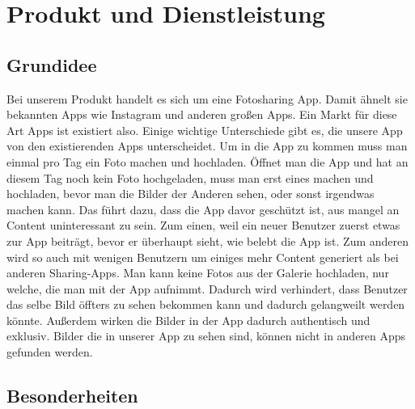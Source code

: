 \chapter{Produkt und Dienstleistung}


\section{Grundidee}

Bei unserem Produkt handelt es sich um eine Fotosharing App. Damit ähnelt sie bekannten Apps wie Instagram und anderen großen Apps. Ein Markt für diese Art Apps ist existiert also. Einige wichtige Unterschiede gibt es, die unsere App von den existierenden Apps unterscheidet.
Um in die App zu kommen muss man einmal pro Tag ein Foto machen und hochladen. Öffnet man die App und hat an diesem Tag noch kein Foto hochgeladen, muss man erst eines machen und hochladen, bevor man die Bilder der Anderen sehen, oder sonst irgendwas machen kann. Das führt dazu, dass die App davor geschützt ist, aus mangel an Content uninteressant zu sein. Zum einen, weil ein neuer Benutzer zuerst etwas zur App beiträgt, bevor er überhaupt sieht, wie belebt die App ist. Zum anderen wird so auch mit wenigen Benutzern um einiges mehr Content generiert als bei anderen Sharing-Apps.
Man kann keine Fotos aus der Galerie hochladen, nur welche, die man mit der App aufnimmt. Dadurch wird verhindert, dass Benutzer das selbe Bild öffters zu sehen bekommen kann und dadurch gelangweilt werden könnte. Außerdem wirken die Bilder in der App dadurch authentisch und exklusiv. Bilder die in unserer App zu sehen sind, können nicht in anderen Apps gefunden werden.

\section{Besonderheiten}

